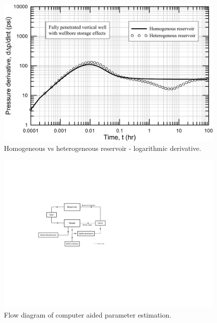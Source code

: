 \documentclass{llncs}
\numberwithin{equation}{section}
\numberwithin{figure}{section}
\numberwithin{table}{section}
\begin{document}
    \begin{figure}
        \begin{center}
        \includegraphics[scale=0.6]{Homogenous_vs_Heterogenous_dpder.pdf}
        \caption{Homogeneous vs heterogeneous reservoir - logarithmic derivative.}
        \label{Homogenous_vs_Heterogenous_dpder}
        \end{center}
    \end{figure}

    \begin{figure}
        \begin{center}
        \includegraphics[scale=0.3]{Flow_Chart1.pdf}
        \caption{Flow diagram of computer aided parameter estimation.}
        \label{Flow_Chart1}
        \end{center}
    \end{figure}


    
    

%
\end{document}
